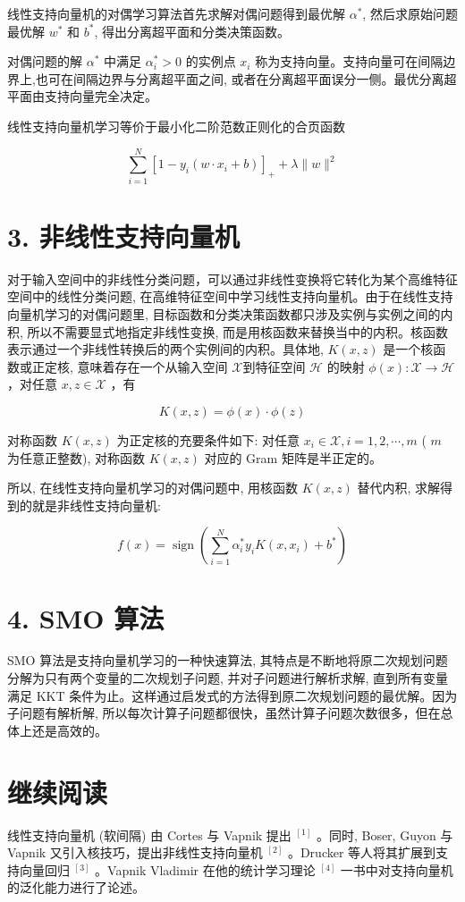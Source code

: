 \documentclass[10pt]{article}
\begin{document}
线性支持向量机的对偶学习算法首先求解对偶问题得到最优解 $\alpha^{*}$, 然后求原始问题最优解 $w^{*}$ 和 $b^{*}$, 得出分离超平面和分类决策函数。

对偶问题的解 $\alpha^{*}$ 中满足 $\alpha_{i}^{*}>0$ 的实例点 $x_{i}$ 称为支持向量。支持向量可在间隔边界上,也可在间隔边界与分离超平面之间, 或者在分离超平面误分一侧。最优分离超平面由支持向量完全决定。

线性支持向量机学习等价于最小化二阶范数正则化的合页函数

$$
\sum_{i=1}^{N}\left[1-y_{i}\left(w \cdot x_{i}+b\right)\right]_{+}+\lambda\|w\|^{2}
$$

\section*{3. 非线性支持向量机}
对于输入空间中的非线性分类问题，可以通过非线性变换将它转化为某个高维特征空间中的线性分类问题, 在高维特征空间中学习线性支持向量机。由于在线性支持向量机学习的对偶问题里, 目标函数和分类决策函数都只涉及实例与实例之间的内积, 所以不需要显式地指定非线性变换, 而是用核函数来替换当中的内积。核函数表示通过一个非线性转换后的两个实例间的内积。具体地, $K(x, z)$ 是一个核函数或正定核, 意味着存在一个从输入空间 $\mathcal{X}$到特征空间 $\mathcal{H}$ 的映射 $\phi(x): \mathcal{X} \rightarrow \mathcal{H}$ ，对任意 $x, z \in \mathcal{X}$ ，有

$$
K(x, z)=\phi(x) \cdot \phi(z)
$$

对称函数 $K(x, z)$ 为正定核的充要条件如下: 对任意 $x_{i} \in \mathcal{X}, i=1,2, \cdots, m$ ( $m$ 为任意正整数), 对称函数 $K(x, z)$ 对应的 Gram 矩阵是半正定的。

所以, 在线性支持向量机学习的对偶问题中, 用核函数 $K(x, z)$ 替代内积, 求解得到的就是非线性支持向量机:

$$
f(x)=\operatorname{sign}\left(\sum_{i=1}^{N} \alpha_{i}^{*} y_{i} K\left(x, x_{i}\right)+b^{*}\right)
$$

\section*{4. SMO 算法}
SMO 算法是支持向量机学习的一种快速算法, 其特点是不断地将原二次规划问题分解为只有两个变量的二次规划子问题, 并对子问题进行解析求解, 直到所有变量满足 KKT 条件为止。这样通过启发式的方法得到原二次规划问题的最优解。因为子问题有解析解, 所以每次计算子问题都很快，虽然计算子问题次数很多，但在总体上还是高效的。

\section*{继续阅读}
线性支持向量机 (软间隔) 由 Cortes 与 Vapnik 提出 ${ }^{[1]}$ 。同时, Boser, Guyon 与 Vapnik 又引入核技巧，提出非线性支持向量机 ${ }^{[2]}$ 。Drucker 等人将其扩展到支持向量回归 ${ }^{[3]}$ 。Vapnik Vladimir 在他的统计学习理论 ${ }^{[4]}$ 一书中对支持向量机的泛化能力进行了论述。
\end{document}
